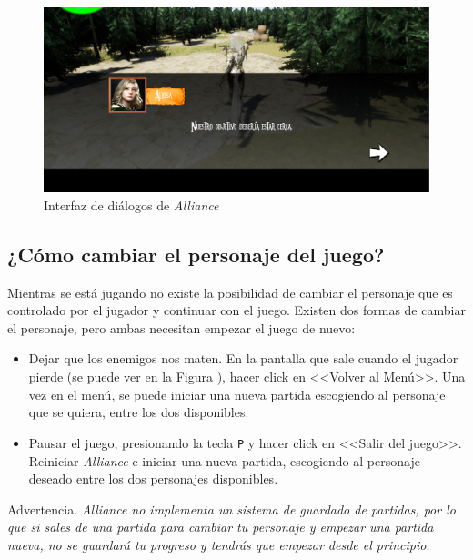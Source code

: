 \begin{figure}[H]
  \centering
  \includegraphics[width=12cm]{./images/Dialogo.png}
  \caption{Interfaz de diálogos de \textit{Alliance}}
  \label{Dialogo}
\end{figure}


\subsection{¿Cómo cambiar el personaje del juego?}

Mientras se está jugando no existe la posibilidad de cambiar el personaje que es controlado por el jugador y continuar con el juego. Existen dos formas de cambiar el personaje, pero ambas necesitan empezar el juego de nuevo:

\begin{itemize}
\item Dejar que los enemigos nos maten. En la pantalla que sale cuando el jugador pierde (se puede ver en la Figura ), hacer click en <<Volver al Menú>>. Una vez en el menú, se puede iniciar una nueva partida escogiendo al personaje que se quiera, entre los dos disponibles.
\item Pausar el juego, presionando la tecla \texttt{P} y hacer click en <<Salir del juego>>. Reiniciar \textit{Alliance} e iniciar una nueva partida, escogiendo al personaje deseado entre los dos personajes disponibles.
\end{itemize}

\renewcommand\bcStyleTitre[1]{\large\hspace*{1.8in}\textcolor{red!100}{#1}}
\begin{bclogo}[
  couleur=red!15,
  arrondi=0.25,
  logo=\hspace*{1in}\bctakecare,
  barre=none,
  noborder=true]{\hspace*{0.15in} Advertencia.}
\itshape \vspace*{0.15in}
\textit{Alliance} no implementa un sistema de guardado de partidas, por lo que si sales de una partida para cambiar tu personaje y empezar una partida nueva, no se guardará tu progreso y tendrás que empezar desde el principio.
\end{bclogo}


